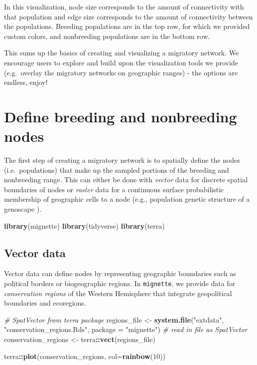 \documentclass[
]{book}
\newenvironment{Shaded}{\begin{snugshade}}{\end{snugshade}}
\newcommand{\AttributeTok}[1]{\textcolor[rgb]{0.13,0.29,0.53}{#1}}
\newcommand{\CommentTok}[1]{\textcolor[rgb]{0.56,0.35,0.01}{\textit{#1}}}
\newcommand{\DecValTok}[1]{\textcolor[rgb]{0.00,0.00,0.81}{#1}}
\newcommand{\FunctionTok}[1]{\textcolor[rgb]{0.13,0.29,0.53}{\textbf{#1}}}
\newcommand{\NormalTok}[1]{#1}
\newcommand{\OtherTok}[1]{\textcolor[rgb]{0.56,0.35,0.01}{#1}}
\newcommand{\SpecialCharTok}[1]{\textcolor[rgb]{0.81,0.36,0.00}{\textbf{#1}}}
\newcommand{\StringTok}[1]{\textcolor[rgb]{0.31,0.60,0.02}{#1}}
\begin{document}
In this visualization, node size corresponds to the amount of connectivity with that population and edge size corresponds to the amount of connectivity between the populations. Breeding populations are in the top row, for which we provided custom colors, and nonbreeding populations are in the bottom row.

This sums up the basics of creating and visualizing a migratory network. We encourage users to explore and build upon the visualization tools we provide (e.g.~overlay the migratory networks on geographic ranges) - the options are endless, enjoy!

\hypertarget{nodes}{%
\chapter{Define breeding and nonbreeding nodes}\label{nodes}}

The first step of creating a migratory network is to spatially define the nodes (i.e.~populations) that make up the sampled portions of the breeding and nonbreeding range. This can either be done with \emph{vector} data for discrete spatial boundaries of nodes or \emph{raster} data for a continuous surface probabilistic membership of geographic cells to a node (e.g., population genetic structure of a genoscape \citep{ruegg2020genoscape}).

\begin{Shaded}
\begin{Highlighting}[]
\FunctionTok{library}\NormalTok{(mignette)}
\FunctionTok{library}\NormalTok{(tidyverse)}
\FunctionTok{library}\NormalTok{(terra)}
\end{Highlighting}
\end{Shaded}

\hypertarget{vector-data}{%
\section{Vector data}\label{vector-data}}

Vector data can define nodes by representing geographic boundaries such as political borders or biogeographic regions. In \texttt{mignette}, we provide data for \emph{conservation regions} of the Western Hemisphere that integrate geopolitical boundaries and ecoregions.

\begin{Shaded}
\begin{Highlighting}[]
\CommentTok{\# SpatVector from terra package}
\NormalTok{regions\_file }\OtherTok{\textless{}{-}} \FunctionTok{system.file}\NormalTok{(}\StringTok{"extdata"}\NormalTok{, }\StringTok{"conservation\_regions.Rds"}\NormalTok{, }\AttributeTok{package =} \StringTok{"mignette"}\NormalTok{)}
\CommentTok{\# read in file as SpatVector}
\NormalTok{conservation\_regions }\OtherTok{\textless{}{-}}\NormalTok{ terra}\SpecialCharTok{::}\FunctionTok{vect}\NormalTok{(regions\_file)}

\NormalTok{terra}\SpecialCharTok{::}\FunctionTok{plot}\NormalTok{(conservation\_regions, }\AttributeTok{col=}\FunctionTok{rainbow}\NormalTok{(}\DecValTok{10}\NormalTok{))}
\end{Highlighting}
\end{Shaded}
\end{document}
